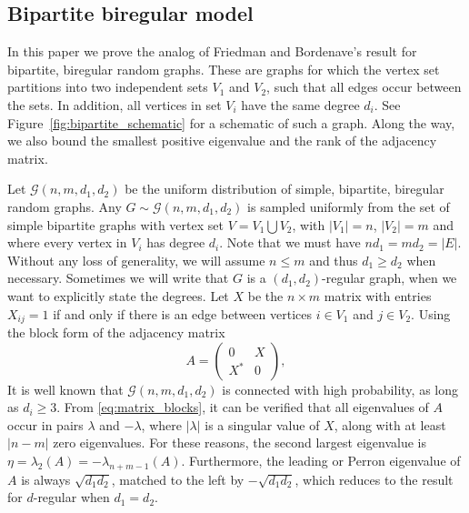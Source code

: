 \subsection{Bipartite biregular model}

In this paper we prove the analog of Friedman and Bordenave's result 
for bipartite, biregular random graphs. 
These are graphs for which the vertex set partitions into two independent
sets $V_1$ and $V_2$, such that all edges occur between the sets.
In addition, all vertices in set $V_i$ have the same degree $d_i$.
See Figure~\ref{fig:bipartite_schematic} for a schematic of such a graph.
Along the way, we also bound the smallest positive eigenvalue and
the rank of the adjacency matrix.

Let $\mathcal{G}(n,m,d_1,d_2)$ be the uniform distribution of
simple, bipartite, biregular random graphs. 
Any $G \sim \mathcal{G}(n,m,d_1,d_2)$ 
is sampled uniformly from the set of simple bipartite graphs 
with vertex set $V=V_1 \bigcup V_2$, 
with $|V_1|=n$, $|V_2|=m$ 
and where every vertex in $V_i$ has degree $d_i$. 
Note that we must have $n d_1 = m d_2 = |E|$.
Without any loss of generality, we will assume $n \leq m$
and thus $d_1 \geq d_2$
when necessary.
Sometimes we will write that $G$ is a $(d_1, d_2)$-regular graph, 
when we want to explicitly state the degrees.
Let $X$ be the $n \times m$ matrix with entries $X_{ij}=1$ 
if and only if there is an edge between vertices 
$i \in V_1$ and $j \in V_2$. 
Using the block form of the adjacency matrix
\begin{equation}
\label{eq:matrix_blocks}
A=\left(\begin{array}{cc} 0 & X \\
X^* & 0 \end{array}\right ),
\end{equation}
It is well known that $\mathcal{G}(n,m,d_1,d_2)$ is connected with high probability, as long as $d_i\geq 3$. From \eqref{eq:matrix_blocks}, it can be verified that all eigenvalues of $A$
occur in pairs $\lambda$ and $-\lambda$,
where $|\lambda|$ is a singular value of $X$,
along with at least $|n - m|$ zero eigenvalues.
For these reasons, the second largest eigenvalue is
$\eta = \lambda_2(A) = -\lambda_{n+m-1} (A)$.
Furthermore,  
the leading or Perron 
eigenvalue of $A$ is always $\sqrt{d_1 d_2}$, matched to the left by $-\sqrt{d_1d_2}$,
which reduces to the result for $d$-regular when $d_1 = d_2$.
